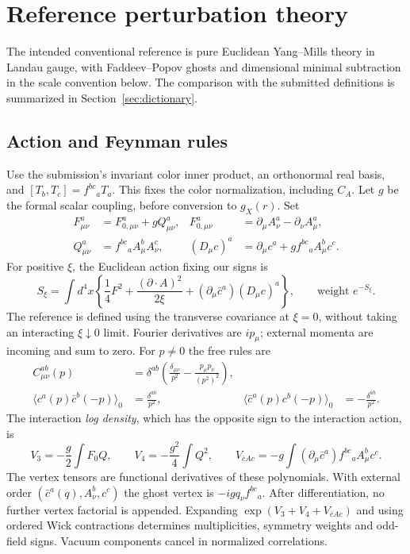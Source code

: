 \documentclass[11pt]{article}
\begin{document}
\section{Reference perturbation theory}
\label{sec:conventions}

The intended conventional reference is pure Euclidean Yang--Mills theory
in Landau gauge, with Faddeev--Popov ghosts and dimensional minimal
subtraction in the scale convention below. The comparison with the submitted
definitions is summarized in Section~\ref{sec:dictionary}.

\subsection{Action and Feynman rules}

Use the submission's invariant color inner product, an orthonormal real
basis, and $[T_b,T_c]=f^{bc}{}_{a}T_a$. This fixes the color normalization,
including $C_A$. Let $g$ be the formal scalar coupling, before conversion
to $g_X(r)$. Set
\begin{align}
 F^a_{\mu\nu}&=F^a_{0,\mu\nu}+gQ^a_{\mu\nu},&
 F^a_{0,\mu\nu}&=\partial_\mu A^a_\nu-\partial_\nu A^a_\mu,\nonumber\\
 Q^a_{\mu\nu}&=f^{bc}{}_{a}A^b_\mu A^c_\nu,&
 (D_\mu c)^a&=\partial_\mu c^a+g f^{bc}{}_{a}A^b_\mu c^c.
\end{align}
For positive $\xi$, the Euclidean action fixing our signs is
\begin{equation}\label{eq:action}
 S_\xi=\int d^4x\left\{\frac14 F^2+
 \frac{(\partial\cdot A)^2}{2\xi}
 +(\partial_\mu\bar c^a)(D_\mu c)^a\right\},\qquad\text{weight }e^{-S_\xi}.
\end{equation}
The reference is defined using the transverse covariance at $\xi=0$, without
taking an interacting $\xi\downarrow0$ limit. Fourier derivatives are
$ip_\mu$; external momenta are incoming and sum to zero.
For $p\ne0$ the free rules are
\begin{align}
 C^{ab}_{\mu\nu}(p)&=\delta^{ab}
 \left(\frac{\delta_{\mu\nu}}{p^2}-\frac{p_\mu p_\nu}{(p^2)^2}\right),
 \label{eq:gauge-line}\\
 \langle c^a(p)\bar c^b(-p)\rangle_0&=\frac{\delta^{ab}}{p^2},&
 \langle\bar c^a(p)c^b(-p)\rangle_0&=-\frac{\delta^{ab}}{p^2}.
 \label{eq:ghost-lines}
\end{align}
The interaction \emph{log density}, which has the opposite sign to the
interaction action, is
\begin{equation}\label{eq:vertices}
 V_3=-\frac g2\int F_0Q,\qquad
 V_4=-\frac{g^2}{4}\int Q^2,\qquad
 V_{\bar cAc}=-g\int(\partial_\mu\bar c^a)f^{bc}{}_{a}A^b_\mu c^c.
\end{equation}
The vertex tensors are functional derivatives of these polynomials. With
external order $(\bar c^a(q),A^b_\nu,c^c)$ the ghost vertex is
$-igq_\nu f^{bc}{}_{a}$. After differentiation, no further vertex factorial
is appended. Expanding $\exp(V_3+V_4+V_{\bar cAc})$ and using ordered Wick
contractions determines multiplicities, symmetry weights and odd-field
signs. Vacuum components cancel in normalized correlations.
\end{document}
